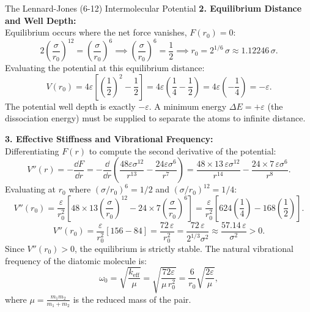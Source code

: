 \begin{workedexample}{The Lennard-Jones (6-12) Intermolecular Potential}
\textbf{2. Equilibrium Distance and Well Depth:}\\
Equilibrium occurs where the net force vanishes, $F(r_0) = 0$:
\[
2\left(\frac{\sigma}{r_0}\right)^{12} = \left(\frac{\sigma}{r_0}\right)^6 \implies \left(\frac{\sigma}{r_0}\right)^6 = \frac{1}{2} \implies r_0 = 2^{1/6}\,\sigma \approx 1.12246\,\sigma.
\]
Evaluating the potential at this equilibrium distance:
\[
V(r_0) = 4\varepsilon \left[ \left(\frac{1}{2}\right)^2 - \frac{1}{2} \right] = 4\varepsilon \left( \frac{1}{4} - \frac{1}{2} \right) = 4\varepsilon \left(-\frac{1}{4}\right) = -\varepsilon.
\]
The potential well depth is exactly $-\varepsilon$. A minimum energy $\Delta E = +\varepsilon$ (the dissociation energy) must be supplied to separate the atoms to infinite distance.

\textbf{3. Effective Stiffness and Vibrational Frequency:}\\
Differentiating $F(r)$ to compute the second derivative of the potential:
\[
V''(r) = -\frac{\dd F}{\dd r} = -\frac{\dd}{\dd r}\left( \frac{48\varepsilon \sigma^{12}}{r^{13}} - \frac{24\varepsilon \sigma^6}{r^7} \right) = \frac{48 \times 13\,\varepsilon \sigma^{12}}{r^{14}} - \frac{24 \times 7\,\varepsilon \sigma^6}{r^8}.
\]
Evaluating at $r_0$ where $(\sigma/r_0)^6 = 1/2$ and $(\sigma/r_0)^{12} = 1/4$:
\[
V''(r_0) = \frac{\varepsilon}{r_0^2}\left[ 48 \times 13 \left(\frac{\sigma}{r_0}\right)^{12} - 24 \times 7 \left(\frac{\sigma}{r_0}\right)^6 \right] = \frac{\varepsilon}{r_0^2}\left[ 624\left(\frac{1}{4}\right) - 168\left(\frac{1}{2}\right) \right].
\]
\[
V''(r_0) = \frac{\varepsilon}{r_0^2}\left[ 156 - 84 \right] = \frac{72\,\varepsilon}{r_0^2} = \frac{72\,\varepsilon}{2^{1/3}\sigma^2} \approx \frac{57.14\,\varepsilon}{\sigma^2} > 0.
\]
Since $V''(r_0) > 0$, the equilibrium is strictly stable. The natural vibrational frequency of the diatomic molecule is:
\[
\omega_0 = \sqrt{\frac{k_{\text{eff}}}{\mu}} = \sqrt{\frac{72\varepsilon}{\mu\, r_0^2}} = \frac{6}{r_0}\sqrt{\frac{2\varepsilon}{\mu}},
\]
where $\mu = \frac{m_1 m_2}{m_1 + m_2}$ is the reduced mass of the pair.
\end{workedexample}

